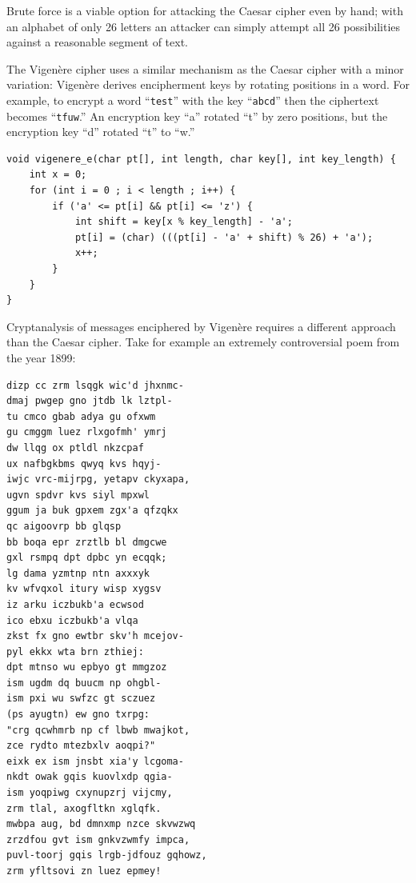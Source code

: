 \documentclass{book}
\begin{document}
Brute force is a viable option for attacking the Caesar cipher even by hand; with an alphabet of only 26 letters an attacker can simply attempt all 26 possibilities against a reasonable segment of text.

The Vigen\`ere cipher uses a similar mechanism as the Caesar cipher with a minor variation: Vigen\`ere derives encipherment keys by rotating positions in a word. For example, to encrypt a word ``\texttt{test}'' with the key ``\texttt{abcd}'' then the ciphertext becomes ``\texttt{tfuw}.'' An encryption key ``a'' rotated ``t'' by zero positions, but the encryption key ``d'' rotated ``t'' to ``w.''

\begin{lstlisting}[caption={A C function to encrypt a string using the Vigen\`ere cipher},captionpos=b]
void vigenere_e(char pt[], int length, char key[], int key_length) {
    int x = 0;
    for (int i = 0 ; i < length ; i++) {
        if ('a' <= pt[i] && pt[i] <= 'z') {
            int shift = key[x % key_length] - 'a';
            pt[i] = (char) (((pt[i] - 'a' + shift) % 26) + 'a');
            x++;
        }
    }
}
\end{lstlisting}

Cryptanalysis of messages enciphered by Vigen\`ere requires a different approach than the Caesar cipher. Take for example an extremely controversial poem from the year 1899:


\begin{lstlisting}[caption={A controversial poem from 1899 encrypted by a Vigen\`ere cipher},captionpos=b]
dizp cc zrm lsqgk wic'd jhxnmc-
dmaj pwgep gno jtdb lk lztpl-
tu cmco gbab adya gu ofxwm
gu cmggm luez rlxgofmh' ymrj
dw llqg ox ptldl nkzcpaf
ux nafbgkbms qwyq kvs hqyj-
iwjc vrc-mijrpg, yetapv ckyxapa,
ugvn spdvr kvs siyl mpxwl
ggum ja buk gpxem zgx'a qfzqkx
qc aigoovrp bb glqsp
bb boqa epr zrztlb bl dmgcwe
gxl rsmpq dpt dpbc yn ecqqk;
lg dama yzmtnp ntn axxxyk
kv wfvqxol itury wisp xygsv
iz arku iczbukb'a ecwsod
ico ebxu iczbukb'a vlqa
zkst fx gno ewtbr skv'h mcejov-
pyl ekkx wta brn zthiej:
dpt mtnso wu epbyo gt mmgzoz
ism ugdm dq buucm np ohgbl-
ism pxi wu swfzc gt sczuez
(ps ayugtn) ew gno txrpg:
"crg qcwhmrb np cf lbwb mwajkot,
zce rydto mtezbxlv aoqpi?"
eixk ex ism jnsbt xia'y lcgoma-
nkdt owak gqis kuovlxdp qgia-
ism yoqpiwg cxynupzrj vijcmy,
zrm tlal, axogfltkn xglqfk.
mwbpa aug, bd dmnxmp nzce skvwzwq
zrzdfou gvt ism gnkvzwmfy impca,
puvl-toorj gqis lrgb-jdfouz gqhowz,
zrm yfltsovi zn luez epmey!
\end{lstlisting}
\end{document}
